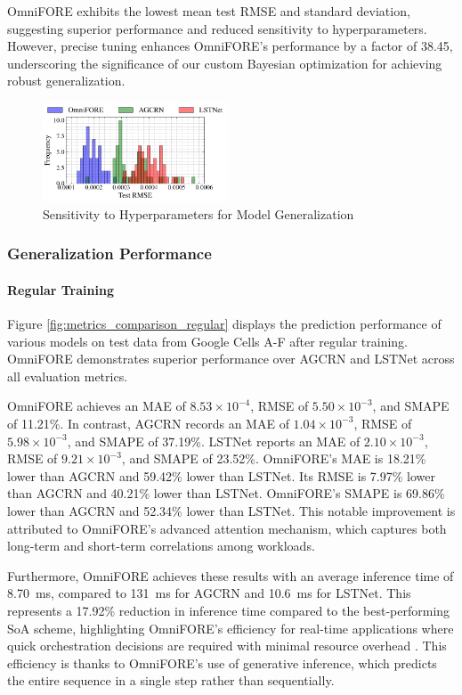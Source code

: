 \documentclass{ieeetmlcn}
\begin{document}
OmniFORE exhibits the lowest mean test RMSE and standard deviation, suggesting superior performance and reduced sensitivity to hyperparameters. However, precise tuning enhances OmniFORE's performance by a factor of 38.45, underscoring the significance of our custom Bayesian optimization for achieving robust generalization.

\begin{figure}%
\centering
\includegraphics[width=0.49\textwidth]{img/test_rmse_distribution_histogram.pdf}
\caption{Sensitivity to Hyperparameters for Model Generalization}
\label{fig:test_rmse_distribution_histogram}
\end{figure}

\subsubsection{\textbf{Generalization Performance}}
\label{sec: Evaluation - Generalization Performance}
\paragraph*{Regular Training}
Figure \ref{fig:metrics_comparison_regular} displays the prediction performance of various models on test data from Google Cells A-F after regular training. OmniFORE demonstrates superior performance over AGCRN and LSTNet across all evaluation metrics.

OmniFORE achieves an MAE of $8.53 \times 10^{-4}$, RMSE of $5.50 \times 10^{-3}$, and SMAPE of 11.21\%. In contrast, AGCRN records an MAE of $1.04 \times 10^{-3}$, RMSE of $5.98 \times 10^{-3}$, and SMAPE of 37.19\%. LSTNet reports an MAE of $2.10 \times 10^{-3}$, RMSE of $9.21 \times 10^{-3}$, and SMAPE of 23.52\%. OmniFORE's MAE is 18.21\% lower than AGCRN and 59.42\% lower than LSTNet. Its RMSE is 7.97\% lower than AGCRN and 40.21\% lower than LSTNet. OmniFORE's SMAPE is 69.86\% lower than AGCRN and 52.34\% lower than LSTNet. This notable improvement is attributed to OmniFORE's advanced attention mechanism, which captures both long-term and short-term correlations among workloads.

Furthermore, OmniFORE achieves these results with an average inference time of \SI{8.70}{\milli\second}, compared to \SI{131}{\milli\second} for AGCRN and \SI{10.6}{\milli\second} for LSTNet. This represents a 17.92\% reduction in inference time compared to the best-performing SoA scheme, highlighting OmniFORE's efficiency for real-time applications where quick orchestration decisions are required with minimal resource overhead \cite{9500858, 8334540}. This efficiency is thanks to OmniFORE's use of generative inference, which predicts the entire sequence in a single step rather than sequentially.
\end{document}
